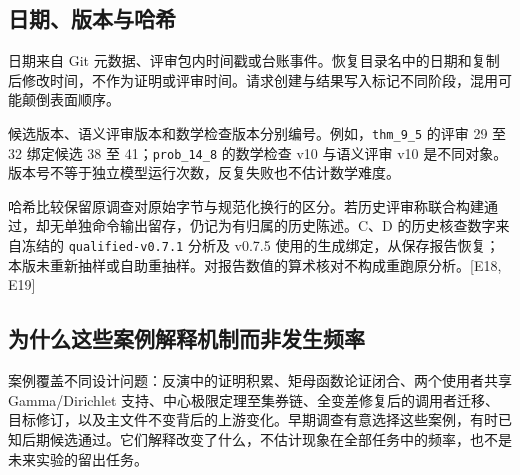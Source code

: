 \subsection[日期、版本与哈希]{\texorpdfstring{\protect\hypertarget{a2}{}日期、版本与哈希}{日期、版本与哈希}}
日期来自 Git 元数据、评审包内时间戳或台账事件。恢复目录名中的日期和复制后修改时间，不作为证明或评审时间。请求创建与结果写入标记不同阶段，混用可能颠倒表面顺序。

候选版本、语义评审版本和数学检查版本分别编号。例如，\nolinkurl{thm_9_5} 的评审 29 至 32 绑定候选 38 至 41；\nolinkurl{prob_14_8} 的数学检查 v10 与语义评审 v10 是不同对象。版本号不等于独立模型运行次数，反复失败也不估计数学难度。

哈希比较保留原调查对原始字节与规范化换行的区分。若历史评审称联合构建通过，却无单独命令输出留存，仍记为有归属的历史陈述。C、D 的历史核查数字来自冻结的 \nolinkurl{qualified-v0.7.1} 分析及 v0.7.5 使用的生成绑定，从保存报告恢复；本版未重新抽样或自助重抽样。对报告数值的算术核对不构成重跑原分析。[E18, E19]

\subsection[为什么这些案例解释机制而非发生频率]{\texorpdfstring{\protect\hypertarget{a3}{}为什么这些案例解释机制而非发生频率}{为什么这些案例解释机制而非发生频率}}
案例覆盖不同设计问题：反演中的证明积累、矩母函数论证闭合、两个使用者共享 Gamma/Dirichlet 支持、中心极限定理至集券链、全变差修复后的调用者迁移、目标修订，以及主文件不变背后的上游变化。早期调查有意选择这些案例，有时已知后期候选通过。它们解释改变了什么，不估计现象在全部任务中的频率，也不是未来实验的留出任务。

